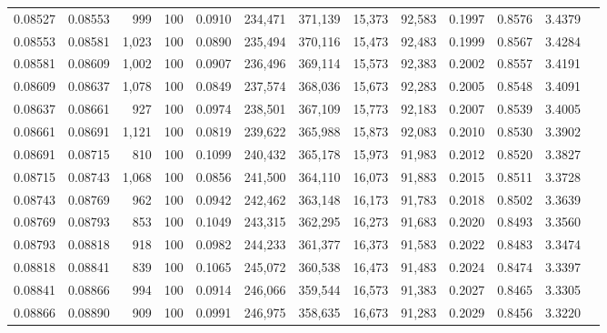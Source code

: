 \begin{tabular}{rrrrrrrrrrrrr}
0.08527 & 0.08553 &   999 & 100 &                                     0.0910 & 234,471 & 371,139 &  15,373 &  92,583 & 0.1997 & 0.8576 & 3.4379 \\
0.08553 & 0.08581 & 1,023 & 100 &                                     0.0890 & 235,494 & 370,116 &  15,473 &  92,483 & 0.1999 & 0.8567 & 3.4284 \\
0.08581 & 0.08609 & 1,002 & 100 &                                     0.0907 & 236,496 & 369,114 &  15,573 &  92,383 & 0.2002 & 0.8557 & 3.4191 \\
0.08609 & 0.08637 & 1,078 & 100 &                                     0.0849 & 237,574 & 368,036 &  15,673 &  92,283 & 0.2005 & 0.8548 & 3.4091 \\
0.08637 & 0.08661 &   927 & 100 &                                     0.0974 & 238,501 & 367,109 &  15,773 &  92,183 & 0.2007 & 0.8539 & 3.4005 \\
0.08661 & 0.08691 & 1,121 & 100 &                                     0.0819 & 239,622 & 365,988 &  15,873 &  92,083 & 0.2010 & 0.8530 & 3.3902 \\
0.08691 & 0.08715 &   810 & 100 &                                     0.1099 & 240,432 & 365,178 &  15,973 &  91,983 & 0.2012 & 0.8520 & 3.3827 \\
0.08715 & 0.08743 & 1,068 & 100 &                                     0.0856 & 241,500 & 364,110 &  16,073 &  91,883 & 0.2015 & 0.8511 & 3.3728 \\
0.08743 & 0.08769 &   962 & 100 &                                     0.0942 & 242,462 & 363,148 &  16,173 &  91,783 & 0.2018 & 0.8502 & 3.3639 \\
0.08769 & 0.08793 &   853 & 100 &                                     0.1049 & 243,315 & 362,295 &  16,273 &  91,683 & 0.2020 & 0.8493 & 3.3560 \\
0.08793 & 0.08818 &   918 & 100 &                                     0.0982 & 244,233 & 361,377 &  16,373 &  91,583 & 0.2022 & 0.8483 & 3.3474 \\
0.08818 & 0.08841 &   839 & 100 &                                     0.1065 & 245,072 & 360,538 &  16,473 &  91,483 & 0.2024 & 0.8474 & 3.3397 \\
0.08841 & 0.08866 &   994 & 100 &                                     0.0914 & 246,066 & 359,544 &  16,573 &  91,383 & 0.2027 & 0.8465 & 3.3305 \\
0.08866 & 0.08890 &   909 & 100 &                                     0.0991 & 246,975 & 358,635 &  16,673 &  91,283 & 0.2029 & 0.8456 & 3.3220 \\

\end{tabular}
